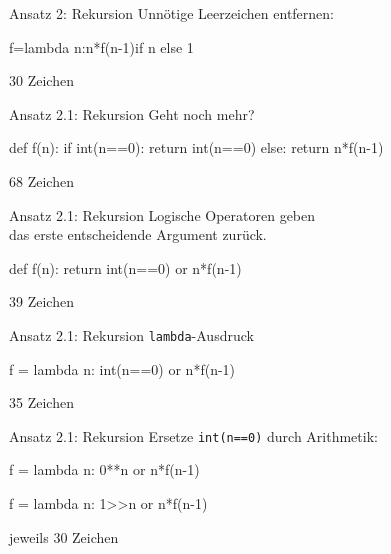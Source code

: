 \documentclass[xcolor=dvipsnames, aspectratio=43, 14pt]{beamer}
\begin{document}
\begin{frame}[fragile]{Ansatz 2: Rekursion}
	Unnötige Leerzeichen entfernen:
	
	\vfill
	
	\begin{python3code}
	f=lambda n:n*f(n-1)if n else 1
	\end{python3code}
	\vfill
	
	30 Zeichen
\end{frame}

\begin{frame}[fragile]{Ansatz 2.1: Rekursion}
	Geht noch mehr?
	
	\vfill
	
	\begin{python3code}
	def f(n):
	   if int(n==0):
	      return int(n==0)
	   else:
	      return n*f(n-1)
	\end{python3code}
	
	\vfill
	
	68 Zeichen
\end{frame}

\begin{frame}[fragile]{Ansatz 2.1: Rekursion}
	Logische Operatoren geben\\ das erste entscheidende Argument zurück.
	
	\vfill
	
	\begin{python3code}
	def f(n):
	   return int(n==0) or n*f(n-1)
	\end{python3code}
	
	\vfill
	
	39 Zeichen
\end{frame}

\begin{frame}[fragile]{Ansatz 2.1: Rekursion}
	\texttt{lambda}-Ausdruck
	
	\vfill
	
	\begin{python3code}
	f = lambda n: int(n==0) or n*f(n-1)
	\end{python3code}
	
	\vfill
	
	35 Zeichen
\end{frame}

\begin{frame}[fragile]{Ansatz 2.1: Rekursion}
	Ersetze \texttt{int(n==0)} durch Arithmetik:
	
	\vfill
	
	\begin{python3code}
	f = lambda n: 0**n or n*f(n-1)
	\end{python3code}
	
	\vfill
	
	\begin{python3code}
	f = lambda n: 1>>n or n*f(n-1)
	\end{python3code}
	
	\vfill
	
	jeweils 30 Zeichen
\end{frame}
\end{document}
